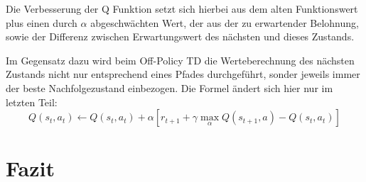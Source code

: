 \documentclass[10pt]{scrartcl}
\begin{document}
Die Verbesserung der Q Funktion setzt sich hierbei aus dem alten Funktionswert plus einen durch $\alpha$ abgeschwächten Wert, der aus der zu erwartender Belohnung, sowie der Differenz zwischen Erwartungswert des nächsten und dieses Zustands.

Im Gegensatz dazu wird beim Off-Policy TD die Werteberechnung des nächsten Zustands nicht nur entsprechend eines Pfades durchgeführt, sonder jeweils immer der beste Nachfolgezustand einbezogen. 
Die Formel ändert sich hier nur im letzten Teil:
\begin{equation}
Q(s_t,a_t) \leftarrow Q(s_t,a_t) + \alpha[r_{t+1}+\gamma  \max_\alpha Q(s_{t+1},a)- Q(s_t,a_t)]
\end{equation}


\section{Fazit}
\end{document}
